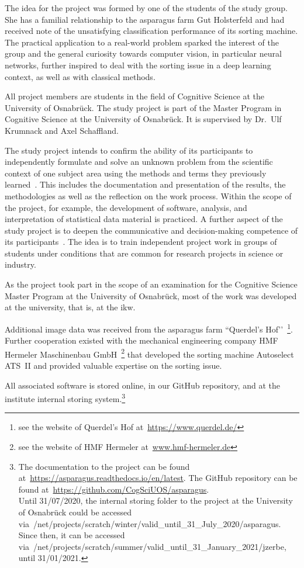 The idea for the project was formed by one of the students of the study group. She has a familial relationship to the asparagus farm Gut Holsterfeld and had received note of the unsatisfying classification performance of its sorting machine. The practical application to a real-world problem sparked the interest of the group and the general curiosity towards computer vision, in particular neural networks, further inspired to deal with the sorting issue in a deep learning context, as well as with classical methods.

All project members are students in the field of Cognitive Science at the University of Osnabr{\"u}ck. The study project is part of the Master Program in Cognitive Science at the University of Osnabr{\"u}ck. It is supervised by Dr.\ Ulf Krumnack and Axel Schaffland.

The study project intends to confirm the ability of its participants to independently formulate and solve an unknown problem from the scientific context of one subject area using the methods and terms they previously learned~\citep{moduledescription,studyregulations}. This includes the documentation and presentation of the results, the methodologies as well as the reflection on the work process. Within the scope of the project, for example, the development of software, analysis, and interpretation of statistical data material is practiced. A further aspect of the study project is to deepen the communicative and decision-making competence of its participants~\citep{moduledescription}. The idea is to train independent project work in groups of students under conditions that are common for research projects in science or industry.

As the project took part in the scope of an examination for the Cognitive Science Master Program at the University of Osnabr{\"u}ck, most of the work was developed at the university, that is, at the \acrfull{ikw}. 

Additional image data was received from the asparagus farm ``Querdel’s Hof’’~\footnote{see the website of Querdel’s Hof at~\url{https://www.querdel.de/}}. Further cooperation existed with the mechanical engineering company HMF Hermeler Maschinenbau GmbH~\footnote{see the website of HMF Hermeler at~\url{www.hmf-hermeler.de}} that developed the sorting machine Autoselect ATS~II and provided valuable expertise on the sorting issue.

All associated software is stored online, in our GitHub repository, and at the institute internal storing system.\footnote{The documentation to the project can be found at~\url{https://asparagus.readthedocs.io/en/latest}. The GitHub repository can be found at~\url{https://github.com/CogSciUOS/asparagus}. \\ Until 31/07/2020, the internal storing folder to the project at the University of Osnabr{\"u}ck could be accessed via~/net/projects/scratch/winter/valid\_until\_31\_July\_2020/asparagus. Since then, it can be accessed via~/net/projects/scratch/summer/valid\_until\_31\_January\_2021/jzerbe, until 31/01/2021.}


